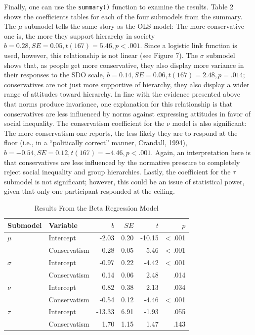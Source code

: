 \documentclass[english,man]{apa6}
\theoremstyle{definition}
\theoremstyle{definition}
\theoremstyle{remark}
\begin{document}
Finally, one can use the \texttt{summary()} function to examine the
results. Table 2 shows the coefficients tables for each of the four
submodels from the summary. The \(\mu\) submodel tells the same story as
the OLS model: The more conservative one is, the more they support
hierarchy in society \(b = 0.28, SE = 0.05, t(167) = 5.46, p < .001\).
Since a logistic link function is used, however, this relationship is
not linear (see Figure 7). The \(\sigma\) submodel shows that, as people
get more conservative, they also display more variance in their
responses to the SDO scale,
\(b = 0.14, SE = 0.06, t(167) = 2.48, p = .014\); conservatives are not
just more supportive of hierarchy, they also display a wider range of
attitudes toward hierarchy. In line with the evidence presented above
that norms produce invariance, one explanation for this relationship is
that conservatives are less influenced by norms against expressing
attitudes in favor of social inequality. The conservatism coefficient
for the \(\nu\) model is also significant: The more conservatism one
reports, the less likely they are to respond at the floor (i.e., in a
``politically correct'' manner, Crandall, 1994),
\(b = -0.54, SE = 0.12, t(167) = -4.46, p < .001\). Again, an
interpretation here is that conservatives are less influenced by the
normative pressure to completely reject social inequality and group
hierarchies. Lastly, the coefficient for the \(\tau\) submodel is not
significant; however, this could be an issue of statistical power, given
that only one participant responded at the ceiling.

\begin{table}[tbp]
\begin{center}
\begin{threeparttable}
\caption{\label{tab:unnamed-chunk-17}Results From the Beta Regression Model}
\begin{tabular}{llrrrr}
\toprule
Submodel & Variable & $b$ & $SE$ & $t$ & $p$\\
\midrule
$\mu$ & Intercept & -2.03 & 0.20 & -10.15 & < .001\\
 & Conservatism & 0.28 & 0.05 & 5.46 & < .001\\
$\sigma$ & Intercept & -0.97 & 0.22 & -4.42 & < .001\\
 & Conservatism & 0.14 & 0.06 & 2.48 & .014\\
$\nu$ & Intercept & 0.82 & 0.38 & 2.13 & .034\\
 & Conservatism & -0.54 & 0.12 & -4.46 & < .001\\
$\tau$ & Intercept & -13.33 & 6.91 & -1.93 & .055\\
 & Conservatism & 1.70 & 1.15 & 1.47 & .143\\
\bottomrule
\end{tabular}
\end{threeparttable}
\end{center}
\end{table}
\end{document}
